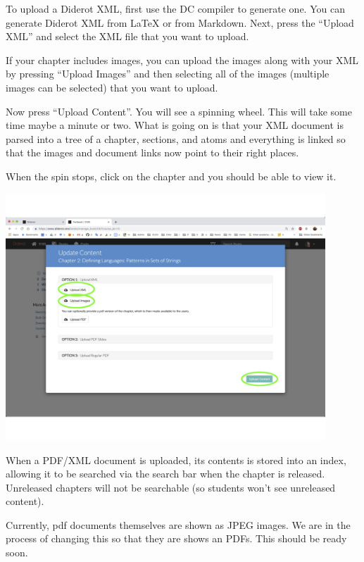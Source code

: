 \begin{gram}
\label{guide:chapter::upload-xml}
To upload a Diderot XML, first use the DC compiler to generate one.  You can generate Diderot XML from LaTeX or from Markdown.  Next, press the ``Upload XML'' and select the XML file that you want to upload. 
%

If your chapter includes images, you can upload the images along with your XML by pressing ``Upload Images'' and then selecting all of the images (multiple images can be selected) that you want to upload.

Now press ``Upload Content''. You will see a spinning wheel.  This will take some time maybe a minute or two.  What is going on is that your XML document is parsed into a tree of a chapter, sections, and atoms and everything is linked so that the images and document links now point to their right places.

When the spin stops, click on the chapter and you should be able to
view it.

\includegraphics[width=0.9\textwidth]{lms/media/upload-xml.jpg}
\end{gram}



\begin{important}
When a PDF/XML document is uploaded, its contents is stored into an index, allowing it to be searched via the search bar when the chapter is released.
%
Unreleased chapters will not be searchable (so students won't see
unreleased content).
\end{important}

\begin{note}
Currently, pdf documents themselves are shown as JPEG images.  We are in the process of changing this so that they are shows an PDFs.  This should be ready soon.
\end{note}


